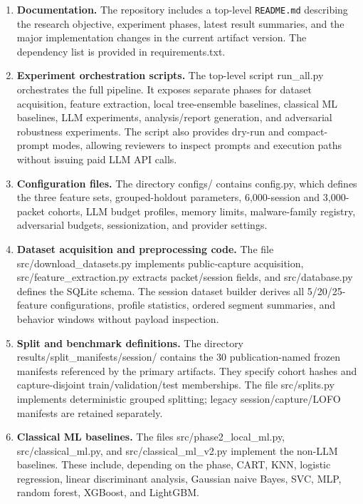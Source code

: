 \documentclass[letterpaper,twocolumn,10pt]{article}
\begin{document}
\begin{enumerate}
    \item \textbf{Documentation.}
    The repository includes a top-level \texttt{README.md} describing the research objective, experiment phases, latest result summaries, and the major implementation changes in the current artifact version. The dependency list is provided in requirements.txt.

    \item \textbf{Experiment orchestration scripts.}
    The top-level script run\_all.py orchestrates the full pipeline. It exposes separate phases for dataset acquisition, feature extraction, local tree-ensemble baselines, classical ML baselines, LLM experiments, analysis/report generation, and adversarial robustness experiments. The script also provides dry-run and compact-prompt modes, allowing reviewers to inspect prompts and execution paths without issuing paid LLM API calls.

    \item \textbf{Configuration files.}
    The directory configs/ contains config.py, which defines the three feature sets, grouped-holdout parameters, 6{,}000-session and 3{,}000-packet cohorts, LLM budget profiles, memory limits, malware-family registry, adversarial budgets, sessionization, and provider settings.

    \item \textbf{Dataset acquisition and preprocessing code.}
    The file src/download\_datasets.py implements public-capture acquisition, src/feature\_extraction.py extracts packet/session fields, and src/database.py defines the SQLite schema. The session dataset builder derives all 5/20/25-feature configurations, profile statistics, ordered segment summaries, and behavior windows without payload inspection.

    \item \textbf{Split and benchmark definitions.}
    The directory results/split\_manifests/session/ contains the 30 publication-named frozen manifests referenced by the primary artifacts. They specify cohort hashes and capture-disjoint train/validation/test memberships. The file src/splits.py implements deterministic grouped splitting; legacy session/capture/LOFO manifests are retained separately.

    \item \textbf{Classical ML baselines.}
    The files src/phase2\_local\_ml.py, src/classical\_ml.py, and src/classical\_ml\_v2.py implement the non-LLM baselines. These include, depending on the phase, CART, KNN, logistic regression, linear discriminant analysis, Gaussian naive Bayes, SVC, MLP, random forest, XGBoost, and LightGBM. 


\end{enumerate}
\end{document}
